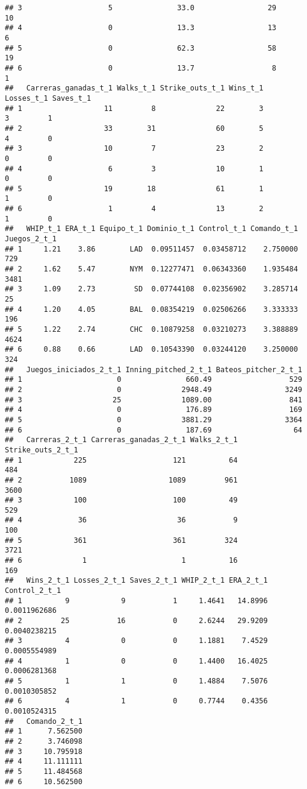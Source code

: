 \documentclass[
]{article}
\begin{document}
\begin{verbatim}
## 3                    5               33.0                 29           10
## 4                    0               13.3                 13            6
## 5                    0               62.3                 58           19
## 6                    0               13.7                  8            1
##   Carreras_ganadas_t_1 Walks_t_1 Strike_outs_t_1 Wins_t_1 Losses_t_1 Saves_t_1
## 1                   11         8              22        3          3         1
## 2                   33        31              60        5          4         0
## 3                   10         7              23        2          0         0
## 4                    6         3              10        1          0         0
## 5                   19        18              61        1          1         0
## 6                    1         4              13        2          1         0
##   WHIP_t_1 ERA_t_1 Equipo_t_1 Dominio_t_1 Control_t_1 Comando_t_1 Juegos_2_t_1
## 1     1.21    3.86        LAD  0.09511457  0.03458712    2.750000          729
## 2     1.62    5.47        NYM  0.12277471  0.06343360    1.935484         3481
## 3     1.09    2.73         SD  0.07744108  0.02356902    3.285714           25
## 4     1.20    4.05        BAL  0.08354219  0.02506266    3.333333          196
## 5     1.22    2.74        CHC  0.10879258  0.03210273    3.388889         4624
## 6     0.88    0.66        LAD  0.10543390  0.03244120    3.250000          324
##   Juegos_iniciados_2_t_1 Inning_pitched_2_t_1 Bateos_pitcher_2_t_1
## 1                      0               660.49                  529
## 2                      0              2948.49                 3249
## 3                     25              1089.00                  841
## 4                      0               176.89                  169
## 5                      0              3881.29                 3364
## 6                      0               187.69                   64
##   Carreras_2_t_1 Carreras_ganadas_2_t_1 Walks_2_t_1 Strike_outs_2_t_1
## 1            225                    121          64               484
## 2           1089                   1089         961              3600
## 3            100                    100          49               529
## 4             36                     36           9               100
## 5            361                    361         324              3721
## 6              1                      1          16               169
##   Wins_2_t_1 Losses_2_t_1 Saves_2_t_1 WHIP_2_t_1 ERA_2_t_1 Control_2_t_1
## 1          9            9           1     1.4641   14.8996  0.0011962686
## 2         25           16           0     2.6244   29.9209  0.0040238215
## 3          4            0           0     1.1881    7.4529  0.0005554989
## 4          1            0           0     1.4400   16.4025  0.0006281368
## 5          1            1           0     1.4884    7.5076  0.0010305852
## 6          4            1           0     0.7744    0.4356  0.0010524315
##   Comando_2_t_1
## 1      7.562500
## 2      3.746098
## 3     10.795918
## 4     11.111111
## 5     11.484568
## 6     10.562500
\end{verbatim}
\end{document}

